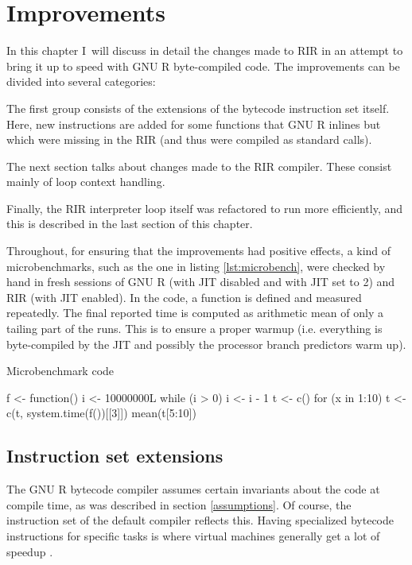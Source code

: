 \chapter{Improvements\label{improvements}}

In this chapter I~will discuss in detail the changes made to RIR in an attempt to bring it up to speed with GNU R byte-compiled code. The improvements can be divided into several categories:

The first group consists of the extensions of the bytecode instruction set itself. Here, new instructions are added for some functions that GNU R inlines but which were missing in the RIR (and thus were compiled as standard calls).

The next section talks about changes made to the RIR compiler. These consist mainly of loop context handling.

Finally, the RIR interpreter loop itself was refactored to run more efficiently, and this is described in the last section of this chapter.

Throughout, for ensuring that the improvements had positive effects, a kind of microbenchmarks, such as the one in listing \ref{lst:microbench}, were checked by hand in fresh sessions of GNU R (with JIT disabled and with JIT set to 2) and RIR (with JIT enabled). In the code, a function is defined and measured repeatedly. The final reported time is computed as arithmetic mean of only a tailing part of the runs. This is to ensure a proper warmup (i.e. everything is byte-compiled by the JIT and possibly the processor branch predictors warm up).

\begin{listing}[htbp]
  \caption{\label{lst:microbench}Microbenchmark code}
  \begin{rcode}
f <- function() {
    i <- 10000000L
    while (i > 0) i <- i - 1
}
t <- c()
for (x in 1:10) t <- c(t, system.time(f())[[3]])
mean(t[5:10])
  \end{rcode}
\end{listing}


\section{Instruction set extensions}

The GNU R bytecode compiler assumes certain invariants about the code at compile time, as was described in section \ref{assumptions}. Of course, the instruction set of the default compiler reflects this. Having specialized bytecode instructions for specific tasks is where virtual machines generally get a lot of speedup \autocite{fastr}.

